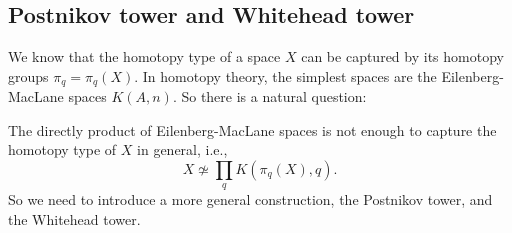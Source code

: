     \subsection{Postnikov tower and Whitehead tower}
    We know that the homotopy type of a space $X$ can be captured 
    by its homotopy groups $\pi_q=\pi_q(X)$. In homotopy theory, 
    the simplest spaces are the Eilenberg-MacLane spaces $K(A,n)$. 
    So there is a natural question:
    \begin{center}
    \end{center}
    The directly product of Eilenberg-MacLane spaces is not enough 
    to capture the homotopy type of $X$ in general, i.e.,
    \begin{equation*}
        X \not\simeq \prod_{q}K(\pi_q(X),q).
    \end{equation*} 
    So we need to introduce a more general construction,
    the Postnikov tower, and the Whitehead tower.
